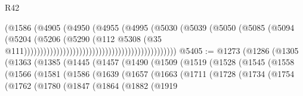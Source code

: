 \begin{lexlean}{R42}
\begin{coremodule}
                                                                    (@1586
                                                                      (@4905
                                                                        (@4950
                                                                          (@4955
                                                                            (@4995
                                                                              (@5030
                                                                                (@5039
                                                                                  (@5050
                                                                                    (@5085
                                                                                      (@5094
                                                                                        (@5204
                                                                                          (@5206
                                                                                            (@5290
                                                                                              (@112
                                                                                                @5308
                                                                                                (@35
                                                                                                  @111)))))))))))))))))))))))))))))))))))))))))))))))
@5405 := @1273
    (@1286
      (@1305
        (@1363
          (@1385
            (@1445
              (@1457
                (@1490
                  (@1509
                    (@1519
                      (@1528
                        (@1545
                          (@1558
                            (@1566
                              (@1581
                                (@1586
                                  (@1639
                                    (@1657
                                      (@1663
                                        (@1711
                                          (@1728
                                            (@1734
                                              (@1754
                                                (@1762
                                                  (@1780
                                                    (@1847
                                                      (@1864
                                                        (@1882
                                                          (@1919

\end{coremodule}
\end{lexlean}
